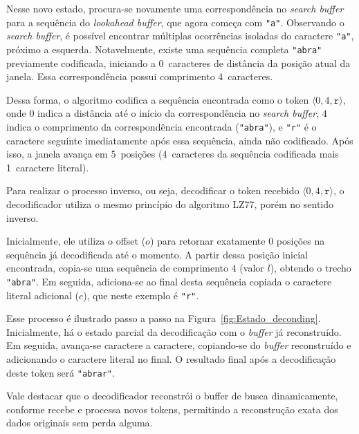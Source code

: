 Nesse novo estado, procura-se novamente uma correspondência no \textit{search
  buffer} para a sequência do \textit{lookahead buffer}, que agora começa com
\texttt{"a"}. Observando o \textit{search buffer}, é possível encontrar
múltiplas ocorrências isoladas do caractere \texttt{"a"}, próximo a esquerda. Notavelmente, existe uma
sequência completa \texttt{"abra"} previamente codificada, iniciando a
0~caracteres de distância da posição atual da janela. Essa correspondência
possui comprimento 4~caracteres.

Dessa forma, o algoritmo codifica a sequência encontrada como o token $\langle
  0, 4, \texttt{r} \rangle$, onde $0$ indica a distância até o início da
correspondência no \textit{search buffer}, $4$ indica o comprimento da
correspondência encontrada (\texttt{"abra"}), e \texttt{"r"} é o caractere
seguinte imediatamente após essa sequência, ainda não codificado. Após isso, a
janela avança em 5~posições (4~caracteres da sequência codificada mais
1~caractere literal).

Para realizar o processo inverso, ou seja, decodificar o token recebido
$\langle 0, 4, \texttt{r} \rangle$, o decodificador utiliza o mesmo princípio
do algoritmo LZ77, porém no sentido inverso.

Inicialmente, ele utiliza o offset ($o$) para retornar exatamente 0 posições na
sequência já decodificada até o momento. A partir dessa posição inicial
encontrada, copia-se uma sequência de comprimento 4 (valor $l$), obtendo o
trecho \texttt{"abra"}. Em seguida, adiciona-se ao final desta sequência
copiada o caractere literal adicional ($c$), que neste exemplo é \texttt{"r"}.

Esse processo é ilustrado passo a passo na Figura~\ref{fig:Estado_deconding}.
Inicialmente, há o estado parcial da decodificação com o \textit{buffer} já
reconstruído. Em seguida, avança-se caractere a caractere, copiando-se do
\textit{buffer} reconstruído e adicionando o caractere literal no final. O
resultado final após a decodificação deste token será \texttt{"abrar"}.

Vale destacar que o decodificador reconstrói o buffer de busca dinamicamente,
conforme recebe e processa novos tokens, permitindo a reconstrução exata dos
dados originais sem perda alguma.


